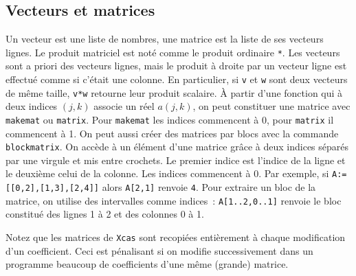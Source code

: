 \documentclass{article}
\begin{document}
\begin{giacjshere}
\subsection{Vecteurs et matrices}
%
Un vecteur est une liste de nombres, une matrice est la liste de ses
vecteurs lignes. Le produit matriciel est not\'e comme le produit
ordinaire \verb|*|. Les vecteurs sont a priori des vecteurs lignes,
mais le produit \`a droite par un vecteur ligne est effectu\'e comme
si c'\'etait une colonne. En particulier, si \verb|v| et \verb|w| 
sont deux vecteurs de m\^eme taille, \verb|v*w| retourne leur produit
scalaire. 
\`A partir d'une fonction qui \`a deux indices $(j,k)$ associe un r\'eel
$a(j,k)$, on peut constituer une matrice avec \verb|makemat| ou
\verb|matrix|. Pour \verb|makemat| les indices commencent \`a 0, pour
\verb|matrix| il commencent \` a 1.
On peut aussi cr\'eer des matrices par blocs avec la commande
\verb|blockmatrix|.
On acc\`ede \`a un \'el\'ement d'une matrice gr\^ace \`a deux indices 
s\'epar\'es par une virgule et mis entre 
crochets. Le premier indice est l'indice de la ligne et le deuxi\`eme 
celui de la colonne. Les indices commencent \`a 0.
Par exemple, si \verb|A:=[[0,2],[1,3],[2,4]]| alors 
\verb|A[2,1]| renvoie \verb|4|.
Pour extraire un bloc de la matrice, on utilise des intervalles
comme indices~: \verb|A[1..2,0..1]| renvoie le bloc
constitu\'e des lignes 1 \`a 2 et des colonnes 0 \`a 1.

Notez que les matrices de {\tt Xcas} sont
recopi\'ees enti\`erement \`a chaque modification d'un coefficient.
Ceci est p\'enalisant si on modifie successivement 
dans un programme beaucoup
de coefficients d'une m\^eme (grande) matrice.


\end{giacjshere}
\end{document}
